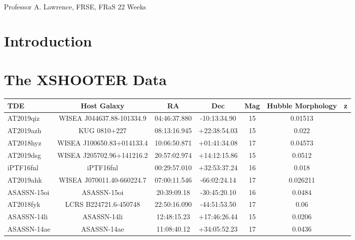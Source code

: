 \documentclass[a4paper,11pt]{article}
\begin{document}
\vfill
{} Professor A. Lawrence, FRSE, FRaS
\hfill
22 Weeks

\newpage
\setcounter{page}{1} %
\tableofcontents

\newpage
\section{Introduction}\label{sec:introduction}

\section{The XSHOOTER Data}

\centering
\begin{tabular}
    {| l | c | c | c | c | c | r |}
    \hline
    TDE         & Host Galaxy               & RA           & Dec          & Mag & Hubble Morphology & z        \\
    \hline
    AT2019qiz   & WISEA J044637.88-101334.9 & 04:46:37.880 & -10:13:34.90 & 15                      & 0.01513  \\
    AT2019azh   & KUG 0810+227              & 08:13:16.945 & +22:38:54.03 & 15                      & 0.022    \\
    AT2018hyz   & WISEA J100650.83+014133.4 & 10:06:50.871 & +01:41:34.08 & 17                      & 0.04573  \\
    AT2019dsg   & WISEA J205702.96+141216.2 & 20:57:02.974 & +14:12:15.86 & 15                      & 0.0512   \\
    iPTF16fnl   & iPTF16fnl                 & 00:29:57.010 & +32:53:37.24 & 16                      & 0.018    \\
    AT2019ahk   & WISEA J070011.40-660224.7 & 07:00:11.546 & -66:02:24.14 & 17                      & 0.026211 \\
    ASASSN-15oi & ASASSN-15oi               & 20:39:09.18  & -30:45:20.10 & 16                      & 0.0484   \\
    AT2018fyk   & LCRS B224721.6-450748     & 22:50:16.090 & -44:51:53.50 & 17                      & 0.06     \\
    ASASSN-14li & ASASSN-14li               & 12:48:15.23  & +17:46:26.44 & 15                      & 0.0206   \\
    ASASSN-14ae & ASASSN-14ae               & 11:08:40.12  & +34:05:52.23 & 17                      & 0.0436   \\
    \hline
\end{tabular}
\end{document}
